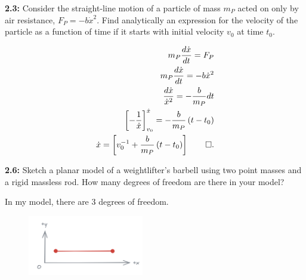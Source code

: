 \begin{homeworkProblem}

	\textbf{2.3:} Consider the straight-line motion of a particle of mass \( m_{P} \) acted on only by air resistance, \( F_{P} = - b \dot{x}^{2} \). Find analytically an expression for the velocity of the particle as a function of time if it starts with initial velocity \( v_{0} \) at time \( t_{0} \).

	\solution

	\begin{align*}
		m_{P} \frac{d\dot{x}}{dt}                             = F_{P}                                     \\
		m_{P} \frac{d\dot{x}}{dt}                             = -b\dot{x}^{2}                             \\
		\frac{d\dot{x}}{\dot{x}^2}                            = - \frac{b}{m_{P}} dt                      \\
		\left[ - \frac{1}{\dot{x}} \right]^{\dot{x}}_{v_{0}}  = - \frac{b}{m_{P}}\left( t - t_{0} \right) \\
		\dot{x}                                               = \left[ v_{0}^{-1} + \frac{b}{m_{P}} \left( t - t_{0} \right) \right] \qed
		.\end{align*}


\end{homeworkProblem}

\begin{homeworkProblem}

	\textbf{2.6:} Sketch a planar model of a weightlifter's barbell using two point masses and a rigid massless rod. How many degrees of freedom are there in your model?

	\solution

	In my model, there are 3 degrees of freedom.
	\begin{figure}[ht]
		\begin{center}
			\includegraphics[width=0.45\textwidth]{images/solution 01-2.6.png}
		\end{center}
	\end{figure}

\end{homeworkProblem}

